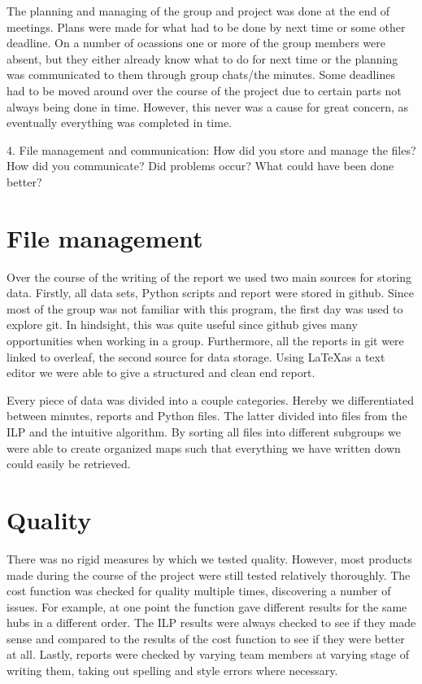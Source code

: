 \documentclass{article}
\begin{document}
    The planning and managing of the group and project was done at the end of meetings. Plans were made for what had to be done by next time or some other deadline. On a number of ocassions one or more of the group members were absent, but they either already know what to do for next time or the planning was communicated to them through group chats/the minutes. Some deadlines had to be moved around over the course of the project due to certain parts not always being done in time. However, this never was a cause for great concern, as eventually everything was completed in time.

4. File management and communication: How did you store and manage the files?
How did you communicate? Did problems occur? What could have been done
better?

\section{File management}

    Over the course of the writing of the report we used two main sources for storing data. Firstly, all data sets, Python scripts and report were stored in github. Since most of the group was not familiar with this program, the first day was used to explore git. In hindsight, this was quite useful since github gives many opportunities when working in a group. Furthermore, all the reports in git were linked to overleaf, the second source for data storage. Using \LaTeX as a text editor we were able to give a structured and clean end report. 
    
    Every piece of data was divided into a couple categories. Hereby we differentiated between minutes, reports and Python files. The latter divided into files from the ILP and the intuitive algorithm. By sorting all files into different subgroups we were able to create organized maps such that everything we have written down could easily be retrieved. 

\section{Quality}

    There was no rigid measures by which we tested quality. However, most products made during the course of the project were still tested relatively thoroughly. The cost function was checked for quality multiple times, discovering a number of issues. For example, at one point the function gave different results for the same hubs in a different order. The ILP results were always checked to see if they made sense and compared to the results of the cost function to see if they were better at all. Lastly, reports were checked by varying team members at varying stage of writing them, taking out spelling and style errors where necessary. 
\end{document}
